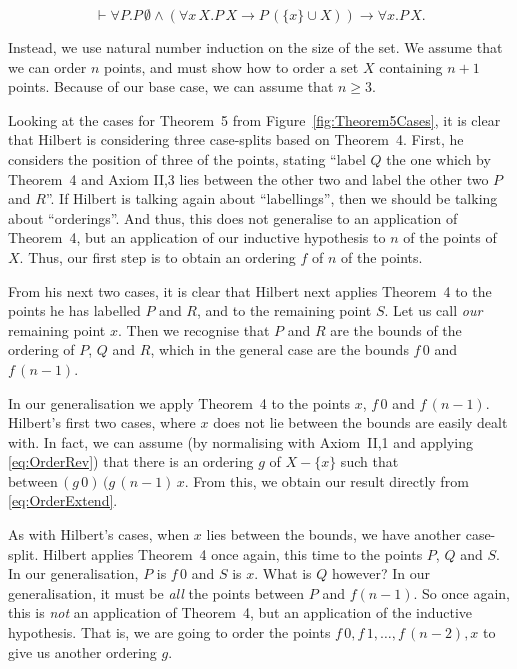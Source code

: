\documentclass{article}
\newcommand{\between}[3]{\text{between}\,#1\,#2\,#3}
\renewcommand{\implies}{\longrightarrow}
\begin{document}
\begin{displaymath}
\vdash \forall P. P\,\emptyset \wedge (\forall x\, X. P\,X \implies P\,(\{x\} \cup X)) \implies \forall x. P\,X.
\end{displaymath}

Instead, we use natural number induction on the size of the set. We assume that we can order $n$ points, and must show how to order a set $X$ containing $n+1$ points. Because of our base case, we can assume that $n \geq 3$.

Looking at the cases for Theorem~5 from Figure~\ref{fig:Theorem5Cases}, it is clear that Hilbert is considering three case-splits based on Theorem~4. First, he considers the position of three of the points, stating ``label $Q$ the one which by Theorem~4 and Axiom II,3 lies between the other two and label the other two $P$ and $R$''. If Hilbert is talking again about ``labellings'', then we should be talking about ``orderings''. And thus, this does not generalise to an application of Theorem~4, but an application of our inductive hypothesis to $n$ of the points of $X.$ Thus, our first step is to obtain an ordering $f$ of $n$ of the points.

From his next two cases, it is clear that Hilbert next applies Theorem~4 to the points he has labelled $P$ and $R$, and to the remaining point $S$. Let us call \emph{our} remaining point $x$. Then we recognise that $P$ and $R$ are the bounds of the ordering of $P$, $Q$ and $R$, which in the general case are the bounds $f\,0$ and $f\,(n - 1)$.

In our generalisation we apply Theorem~4 to the points $x$, $f\,0$ and $f\,(n - 1)$. Hilbert's first two cases, where $x$ does not lie between the bounds are easily dealt with. In fact, we can assume (by normalising with Axiom~II,1 and applying \eqref{eq:OrderRev}) that there is an ordering $g$ of $X - \{x\}$ such that $\between{(g\,0)}{(g\,(n - 1)}{x}$. From this, we obtain our result directly from \eqref{eq:OrderExtend}.

As with Hilbert's cases, when $x$ lies between the bounds, we have another case-split. Hilbert applies Theorem~4 once again, this time to the points $P$, $Q$ and $S$. In our generalisation, $P$ is $f\,0$ and $S$ is $x$. What is $Q$ however? In our generalisation, it must be \emph{all} the points between $P$ and $f(n - 1)$. So once again, this is \emph{not} an application of Theorem~4, but an application of the inductive hypothesis. That is, we are going to order the points $f\,0,f\,1,\ldots,f\,(n - 2),x$ to give us another ordering $g$.
\end{document}
